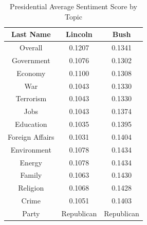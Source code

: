 \begin{singlespace}
\begin{table}[tp]
\begin{center}
 \begin{tabular}{||c || c | c||}
 \hline
 Last Name & Lincoln & Bush \\
 \hline
 Overall & 0.1207 & 0.1341 \\ 
 \hline
 Government & 0.1076 & 0.1302 \\
 \hline
 Economy & 0.1100 & 0.1308 \\
 \hline
 War & 0.1043 & 0.1330 \\
 \hline
  Terrorism & 0.1043 & 0.1330 \\
 \hline
  Jobs & 0.1043 & 0.1374 \\
 \hline
  Education & 0.1035 & 0.1395 \\
 \hline
  Foreign Affairs & 0.1031 & 0.1404 \\
 \hline
  Environment & 0.1078 & 0.1434 \\
 \hline
  Energy & 0.1078 & 0.1434 \\
 \hline
  Family & 0.1063 & 0.1430 \\
 \hline
  Religion & 0.1068 & 0.1428 \\
 \hline
  Crime & 0.1051 & 0.1403 \\
 \hline
  Party & Republican & Republican \\
 \hline
 \end{tabular}
\end{center}
\caption{Presidential Average Sentiment Score by Topic}
\label{table:vector}
\end{table}
\end{singlespace}

